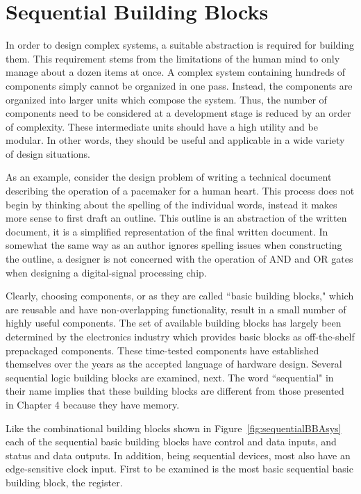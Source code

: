 \chapter{Sequential Building Blocks}
\label{chapter:Sequential Building Blocks}
\graphicspath{ {./chapter06/Fig} }

In order to design complex systems, a suitable
abstraction is required for building them.  This requirement stems from the
limitations of the human mind to only manage about a dozen items
at once.  A complex system containing hundreds of components
simply cannot be organized in one pass.  Instead, the components
are organized into larger units which compose the system. Thus,
the number of components need to be considered at a development stage is reduced
by an order of complexity. These intermediate units should have
a high utility and be modular.  In other words, they should be
useful and applicable in a wide variety of design situations.

As an example, consider the design problem of writing a technical
document describing the operation of a pacemaker for a human heart.
This process does not begin by thinking about the spelling of
the individual words, instead it makes more sense to first
draft an outline.  This outline is an abstraction of the
written document, it is a simplified representation of the final
written document.  In somewhat the same way as an author ignores
spelling issues when constructing the outline, a designer is not concerned with
the operation of AND and OR gates
when designing a digital-signal processing chip.

Clearly, choosing components, or as they are called ``basic
building blocks," which are reusable and have non-overlapping
functionality, result in a small number of highly useful
components.  The set of available building blocks has largely
been determined by the electronics industry which provides basic
blocks as off-the-shelf prepackaged components.  These
time-tested components have established themselves over the years
as the accepted language of hardware design.
Several sequential logic building blocks are examined, next.
The word ``sequential" in their name implies that these building
blocks are different from those presented in Chapter 4 because
they have memory.

Like the combinational building blocks shown in
Figure~\ref{fig:sequentialBBAsys} each of the sequential basic building
blocks have control and data inputs, and status and
data outputs.  In addition, being sequential devices, most
also have an edge-sensitive clock input.  First to be examined is
the most basic sequential basic building block, the register.

